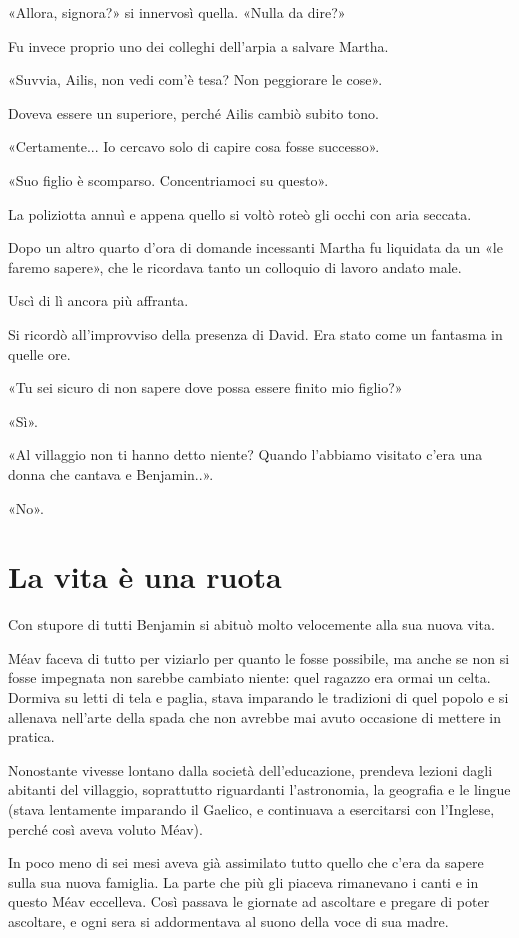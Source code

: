 \documentclass[a4paper,11pt,oneside,openright,final]{memoir}
\begin{document}
«Allora, signora?» si innervosì quella. «Nulla da dire?»

Fu invece proprio uno dei colleghi dell'arpia a salvare Martha.

«Suvvia, Ailis, non vedi com'è tesa? Non peggiorare le cose».

Doveva essere un superiore, perché Ailis cambiò subito tono.

«Certamente... Io cercavo solo di capire cosa fosse successo».

«Suo figlio è scomparso. Concentriamoci su questo».

La poliziotta annuì e appena quello si voltò roteò gli occhi con aria
seccata.

Dopo un altro quarto d'ora di domande incessanti Martha fu liquidata da un «le
faremo sapere», che le ricordava tanto un colloquio di lavoro andato male.

Uscì di lì ancora più affranta.

Si ricordò all'improvviso della presenza di David. Era stato come un fantasma
in quelle ore.

«Tu sei sicuro di non sapere dove possa essere finito mio figlio?»

«Sì».

«Al villaggio non ti hanno detto niente? Quando l'abbiamo visitato c'era una
donna che cantava e Benjamin..».

«No».

\chapter{La vita è una ruota}

Con stupore di tutti Benjamin si abituò molto velocemente alla sua nuova vita.

Méav faceva di tutto per viziarlo per quanto le fosse possibile, ma anche se
non si fosse impegnata non sarebbe cambiato niente: quel ragazzo era ormai un
celta. Dormiva su letti di tela e paglia, stava imparando le tradizioni di quel
popolo e si allenava nell'arte della spada che non avrebbe mai avuto occasione
di mettere in pratica.

Nonostante vivesse lontano dalla società dell'educazione, prendeva lezioni
dagli abitanti del villaggio, soprattutto riguardanti l'astronomia, la geografia
e le lingue (stava lentamente imparando il Gaelico, e continuava a esercitarsi
con l'Inglese, perché così aveva voluto Méav).

In poco meno di sei mesi aveva già assimilato tutto quello che c'era da sapere
sulla sua nuova famiglia. La parte che più gli piaceva rimanevano i canti e in
questo Méav eccelleva. Così passava le giornate ad ascoltare e pregare di
poter ascoltare, e ogni sera si addormentava al suono della voce di sua madre.
\end{document}
